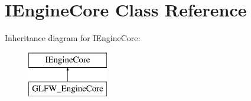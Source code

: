 \hypertarget{class_i_engine_core}{\section{I\+Engine\+Core Class Reference}
\label{class_i_engine_core}
}
Inheritance diagram for I\+Engine\+Core\+:\begin{figure}[H]
\begin{center}
\leavevmode
\includegraphics[height=2.000000cm]{class_i_engine_core}
\end{center}
\end{figure}
